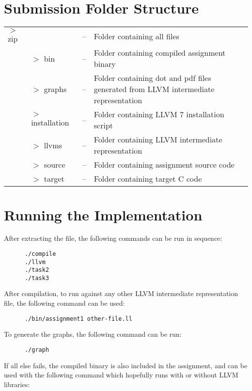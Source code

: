 \documentclass[11pt,a4paper,fleqn]{article}
\begin{document}
   \section{Submission Folder Structure}

   \begin{tabularx}{\linewidth}{l l l X}
      $>$ zip  &                    & -- & Folder containing all files                   \\
               & $>$ bin            & -- & Folder containing compiled assignment binary  \\
               & $>$ graphs         & -- & Folder containing dot and pdf files generated from LLVM intermediate representation  \\
               & $>$ installation   & -- & Folder containing LLVM 7 installation script \\
               & $>$ llvms          & -- & Folder containing LLVM intermediate representation  \\
               & $>$ source         & -- & Folder containing assignment source code  \\
               & $>$ target         & -- & Folder containing target C code  \\
   \end{tabularx}

   \section {Running the Implementation}

   After extracting the file, the following commands can be run in sequence:

   \begin{verbatim}
      ./compile
      ./llvm
      ./task2
      ./task3
   \end{verbatim}

   After compilation, to run against any other LLVM intermediate representation file, the following command can be used:

   \begin{verbatim}
      ./bin/assignment1 other-file.ll
   \end{verbatim}

   To generate the graphs, the following command can be run:

   \begin{verbatim}
      ./graph
   \end{verbatim}

   If all else fails, the compiled binary is also included in the assignment, and can be used with the following command which hopefully runs with or without LLVM libraries:
\end{document}
